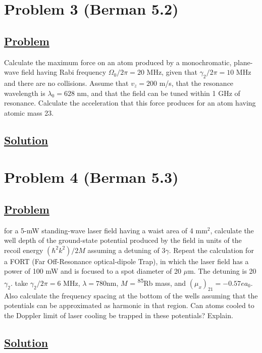 \documentclass[12pt]{article}
\begin{document}
\section*{Problem 3 (Berman 5.2)}
\subsection*{\underline{Problem}}
Calculate the maximum force on an atom produced by a monochromatic, plane-wave field having Rabi frequency $\Omega_0/2\pi = 2   0$ MHz, given that $\gamma_2/2\pi = 10$ MHz and there are no collisions.
Assume that $v_z = 200$ m/s, that the resonance wavelength is $\lambda_0 = 628$ nm, and that the field can be tuned within 1 GHz of resonance.
Calculate the acceleration that this force produces for an atom having atomic mass 23.

\subsection*{\underline{Solution}}


\section*{Problem 4 (Berman 5.3)}
\subsection*{\underline{Problem}}
for a 5-mW standing-wave laser field having a waist area of 4 $\text{mm}^2$, calculate the well depth of the ground-state potential produced by the field in units of the recoil energy $(\hbar^2k^2)/2M$ assuming a detuning of $3\gamma$.
Repeat the calculation for a FORT (Far Off-Resonance optical-dipole Trap), in which the laser field has a power of 100 mW and is focused to a spot diameter of 20 $\mu$m.
The detuning is 20$\gamma_2$. take $\gamma_2/2\pi = 6$ MHz, $\lambda = 780$nm, $M$ = \textsuperscript{85}Rb mass, and $\left(\mu_x\right)_{21} = -0.57ea_0$.
Also calculate the frequency spacing at the bottom of the wells assuming that the potentials can be approximated as harmonic in that region.
Can atoms cooled to the Doppler limit of laser cooling be trapped in these potentials? Explain.

\subsection*{\underline{Solution}}




\end{document}
